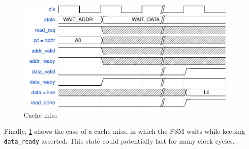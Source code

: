 \begin{figure}[hbt]
  \centering
  \includegraphics[width=\textwidth]{img/cache03.pdf}
  \caption{Cache miss}
  \label{fig:cache03}
\end{figure}
Finally, \cref{fig:cache03} shows the case of a cache miss, in which the \acs{FSM} waits while keeping \texttt{data\_ready} asserted. This state could potentially last for many clock cycles.


